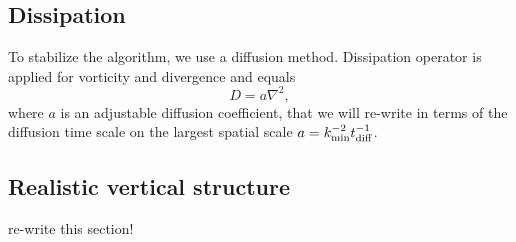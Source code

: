 \documentclass[usenatbib,onecolumn]{mnras}
\newcommand{\alert}[1]{\color{red} #1\color{black}}
\begin{document}
\subsection{Dissipation}

To stabilize the algorithm, we use a diffusion method. Dissipation operator is
applied for vorticity and divergence and equals
\begin{equation}
\displaystyle  D = a\nabla^2 ,
\end{equation}
where $a$ is an adjustable diffusion coefficient, that we will re-write in
terms of the diffusion time scale on the largest spatial scale $a = k_{\rm
  min}^{-2} t_{\rm diff}^{-1}$. 

\subsection{Realistic vertical structure}

\alert{re-write this section!}
\end{document}
